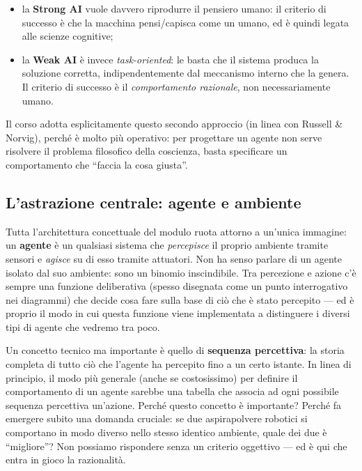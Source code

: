 \documentclass[11pt,a4paper]{article}
\begin{document}
\begin{itemize}
  \item la \textbf{Strong AI} vuole davvero riprodurre il pensiero umano: il criterio di successo è che la macchina pensi/capisca come un umano, ed è quindi legata alle scienze cognitive;
  \item la \textbf{Weak AI} è invece \emph{task-oriented}: le basta che il sistema produca la soluzione corretta, indipendentemente dal meccanismo interno che la genera. Il criterio di successo è il \emph{comportamento razionale}, non necessariamente umano.
\end{itemize}

Il corso adotta esplicitamente questo secondo approccio (in linea con Russell \& Norvig), perché è molto più operativo: per progettare un agente non serve risolvere il problema filosofico della coscienza, basta specificare un comportamento che ``faccia la cosa giusta''.

\subsection{L'astrazione centrale: agente e ambiente}

Tutta l'architettura concettuale del modulo ruota attorno a un'unica immagine: un \textbf{agente} è un qualsiasi sistema che \emph{percepisce} il proprio ambiente tramite sensori e \emph{agisce} su di esso tramite attuatori. Non ha senso parlare di un agente isolato dal suo ambiente: sono un binomio inscindibile. Tra percezione e azione c'è sempre una funzione deliberativa (spesso disegnata come un punto interrogativo nei diagrammi) che decide cosa fare sulla base di ciò che è stato percepito --- ed è proprio il modo in cui questa funzione viene implementata a distinguere i diversi tipi di agente che vedremo tra poco.

Un concetto tecnico ma importante è quello di \textbf{sequenza percettiva}: la storia completa di tutto ciò che l'agente ha percepito fino a un certo istante. In linea di principio, il modo più generale (anche se costosissimo) per definire il comportamento di un agente sarebbe una tabella che associa ad ogni possibile sequenza percettiva un'azione. Perché questo concetto è importante? Perché fa emergere subito una domanda cruciale: se due aspirapolvere robotici si comportano in modo diverso nello stesso identico ambiente, quale dei due è ``migliore''? Non possiamo rispondere senza un criterio oggettivo --- ed è qui che entra in gioco la razionalità.
\end{document}

